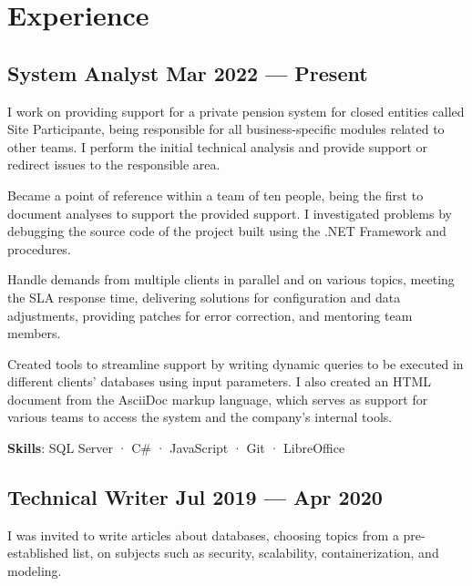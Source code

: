 \section{Experience}

\subsection{System Analyst \hfill Mar 2022 --- Present}

\begin{zitemize}
  \item
    I work on providing support for a private pension system for closed
    entities called Site Participante, being responsible for all
    business-specific modules related to other teams. I perform the initial
    technical analysis and provide support or redirect issues to the
    responsible area.
  \item
    Became a point of reference within a team of ten people, being the first to
    document analyses to support the provided support. I investigated problems
    by debugging the source code of the project built using the .NET Framework
    and procedures.
  \item
    Handle demands from multiple clients in parallel and on various topics,
    meeting the SLA response time, delivering solutions for configuration and
    data adjustments, providing patches for error correction, and mentoring
    team members.
  \item
    Created tools to streamline support by writing dynamic queries to be
    executed in different clients' databases using input parameters. I also
    created an HTML document from the AsciiDoc markup language, which serves as
    support for various teams to access the system and the company's internal
    tools.
\end{zitemize}

\textbf{Skills}: SQL Server · C\# · JavaScript · Git · LibreOffice

\vspace{1em}
\subsection{Technical Writer \hfill Jul 2019 --- Apr 2020}

\begin{zitemize}
  \item
    I was invited to write articles about databases, choosing topics from a
    pre-established list, on subjects such as security, scalability,
    containerization, and modeling.
\end{zitemize}

